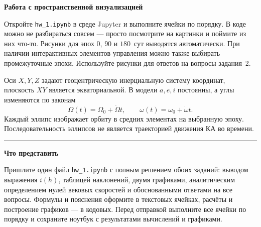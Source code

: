 \documentclass[11pt,a4paper]{article}
\begin{document}
\vspace{4pt}
\textbf{Работа с пространственной визуализацией}

Откройте \texttt{hw\_1.ipynb} в среде Jupyter и выполните ячейки по порядку.
В коде можно не разбираться совсем --- просто посмотрите на картинки и поймите из них что-то.
Рисунки для эпох $0$, $90$ и $180$~сут выводятся автоматически.
При наличии интерактивных элементов управления можно также выбирать промежуточные эпохи.
Используйте рисунки для ответов на вопросы задания~2.

Оси $X,Y,Z$ задают геоцентрическую инерциальную систему координат,
плоскость $XY$ является экваториальной. В модели $a,e,i$ постоянны,
а углы изменяются по законам
\[
\Omega(t)=\Omega_0+\dot\Omega t,\qquad
\omega(t)=\omega_0+\dot\omega t.
\]
Каждый эллипс изображает орбиту в средних элементах на выбранную эпоху.
Последовательность эллипсов не является траекторией движения КА во времени.

\vspace{5pt}
{\color{rulecolor}\hrule}
\vspace{5pt}
\textbf{Что представить}

Пришлите один файл \texttt{hw\_1.ipynb} с полным решением обоих заданий:
выводом выражения $i(h)$, таблицей наклонений, двумя графиками,
аналитическим определением нулей вековых скоростей и обоснованными ответами
на все вопросы. Формулы и пояснения оформите в текстовых ячейках,
расчёты и построение графиков --- в кодовых.
Перед отправкой выполните все ячейки по порядку и сохраните ноутбук
с результатами вычислений и графиками.
\end{document}
